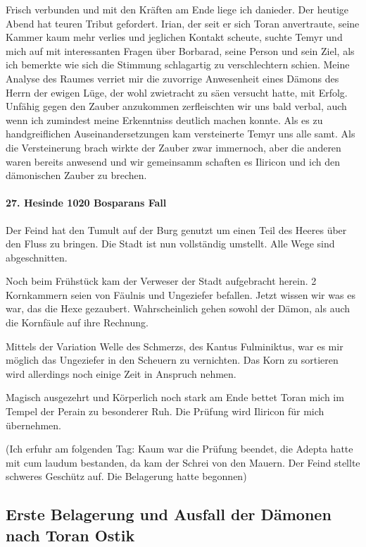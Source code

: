 Frisch verbunden und mit den Kräften am Ende liege ich danieder. Der heutige Abend hat teuren Tribut gefordert. Irian, der seit er sich Toran anvertraute, seine Kammer kaum mehr verlies und jeglichen Kontakt scheute, suchte Temyr und mich auf mit interessanten Fragen über Borbarad, seine Person und sein Ziel, als ich bemerkte wie sich die Stimmung schlagartig zu verschlechtern schien. Meine Analyse des Raumes verriet mir die zuvorrige Anwesenheit eines Dämons des Herrn der ewigen Lüge, der wohl zwietracht zu säen versucht hatte, mit Erfolg. Unfähig gegen den Zauber anzukommen zerfleischten wir uns bald verbal, auch wenn ich zumindest meine Erkenntniss deutlich machen konnte. Als es zu handgreiflichen Auseinandersetzungen kam versteinerte Temyr uns alle samt. Als die Versteinerung brach wirkte der Zauber zwar immernoch, aber die anderen waren bereits anwesend und wir gemeinsamm schaften es Iliricon und ich den dämonischen Zauber zu brechen.

\paragraph{27. Hesinde 1020 Bosparans Fall}
Der Feind hat den Tumult auf der Burg genutzt um einen Teil des Heeres über den Fluss zu bringen. Die Stadt ist nun vollständig umstellt. Alle Wege sind abgeschnitten.

Noch beim Frühstück kam der Verweser der Stadt aufgebracht herein. 2 Kornkammern seien von Fäulnis und Ungeziefer befallen. Jetzt wissen wir was es war, das die Hexe gezaubert. Wahrscheinlich gehen sowohl der Dämon, als auch die Kornfäule auf ihre Rechnung.

Mittels der Variation Welle des Schmerzs, des Kantus Fulminiktus, war es mir möglich das Ungeziefer in den Scheuern zu vernichten. Das Korn zu sortieren wird allerdings noch einige Zeit in Anspruch nehmen.

Magisch ausgezehrt und Körperlich noch stark am Ende bettet Toran mich im Tempel der Perain zu besonderer Ruh. Die Prüfung wird Iliricon für mich übernehmen.

(Ich erfuhr am folgenden Tag: Kaum war die Prüfung beendet, die Adepta hatte mit cum laudum bestanden, da kam der Schrei von den Mauern. Der Feind stellte schweres Geschütz auf. Die Belagerung hatte begonnen)

\subsection{Erste Belagerung und Ausfall der Dämonen nach Toran Ostik}

